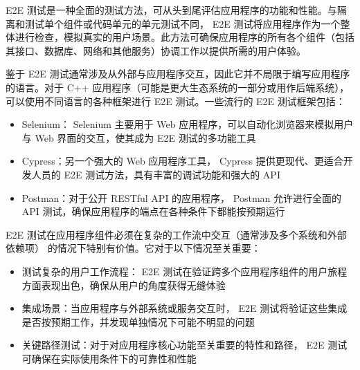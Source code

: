 
E2E 测试是一种全面的测试方法，可从头到尾评估应用程序的功能和性能。与隔离和测试单个组件或代码单元的单元测试不同， E2E 测试将应用程序作为一个整体进行检查，模拟真实的用户场景。此方法可确保应用程序的所有各个组件（包括其接口、数据库、网络和其他服务）协调工作以提供所需的用户体验。


鉴于 E2E 测试通常涉及从外部与应用程序交互，因此它并不局限于编写应用程序的语言。对于 C++ 应用程序（可能是更大生态系统的一部分或用作后端系统），可以使用不同语言的各种框架进行 E2E 测试。一些流行的 E2E 测试框架包括：

\begin{itemize}
\item
Selenium： Selenium 主要用于 Web 应用程序，可以自动化浏览器来模拟用户与 Web 界面的交互，使其成为 E2E 测试的多功能工具

\item
Cypress：另一个强大的 Web 应用程序工具， Cypress 提供更现代、更适合开发人员的 E2E 测试方法，具有丰富的调试功能和强大的 API

\item
Postman：对于公开 RESTful API 的应用程序， Postman 允许进行全面的 API 测试，确保应用程序的端点在各种条件下都能按预期运行
\end{itemize}


E2E 测试在应用程序组件必须在复杂的工作流中交互（通常涉及多个系统和外部依赖项） 的情况下特别有价值。它对于以下情况至关重要：

\begin{itemize}
\item
测试复杂的用户工作流程： E2E 测试在验证跨多个应用程序组件的用户旅程方面表现出色，确保从用户的角度获得无缝体验

\item
集成场景：当应用程序与外部系统或服务交互时， E2E 测试将验证这些集成是否按预期工作，并发现单独情况下可能不明显的问题

\item
关键路径测试：对于对应用程序核心功能至关重要的特性和路径， E2E 测试可确保在实际使用条件下的可靠性和性能
\end{itemize}


